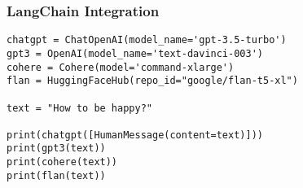 \begin{frame}[fragile]\frametitle{LangChain Integration}

\begin{lstlisting}
chatgpt = ChatOpenAI(model_name='gpt-3.5-turbo')
gpt3 = OpenAI(model_name='text-davinci-003')
cohere = Cohere(model='command-xlarge')
flan = HuggingFaceHub(repo_id="google/flan-t5-xl")

text = "How to be happy?"

print(chatgpt([HumanMessage(content=text)]))
print(gpt3(text))
print(cohere(text))
print(flan(text))
\end{lstlisting}	  

\end{frame}
